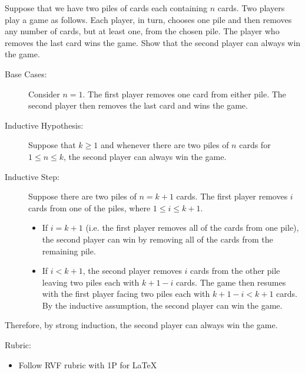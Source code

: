 \documentclass{article}
\theoremstyle{definition}
\begin{document}
\begin{question}
    Suppose that we have two piles of cards each containing $n$ cards. Two players play a game as follows. Each player, in turn, chooses one pile and then removes any number of cards, but at least one, from the chosen pile. The player who removes the last card wins the game. Show that the second player can always win the game.
\end{question}
\begin{solution}
	\begin{description}
	\item[Base Cases: ] Consider $n=1$. The first player removes one card from either pile. The second player then removes the last card and wins the game.
	
	\item[Inductive Hypothesis: ] Suppose that $k\geq 1$ and whenever there are two piles of $n$ cards for $1\leq n\leq k$, the second player can always win the game.
	
	\item[Inductive Step: ] Suppose there are two piles of $n=k+1$ cards. The first player removes $i$ cards from one of the piles, where $1\leq i\leq k+1$. 
	\begin{itemize}
	\item If $i=k+1$ (i.e. the first player removes all of the cards from one pile), the second player can win by removing all of the cards from the remaining pile. 
	\item If $i<k+1$, the second player removes $i$ cards from the other pile leaving two piles each with $k+1-i$ cards. The game then resumes with the first player facing two piles each with $k+1-i<k+1$ cards. By the inductive assumption, the second player can win the game.
	\end{itemize}
	\end{description}
	Therefore, by strong induction, the second player can always win the game.
	
{\color{red} Rubric:
\begin{itemize}
\item Follow RVF rubric with 1P for \LaTeX
\end{itemize}}
\end{solution}
\end{document}
